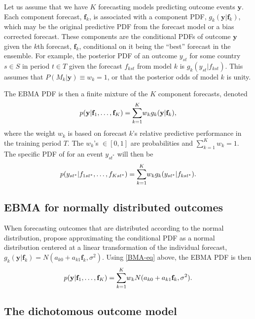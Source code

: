 \documentclass[pdftex,12pt,fullpage,oneside]{amsart}
\begin{document}
Let us assume that we have $K$ forecasting models predicting outcome
events $\mathbf{y}$. Each component forecast, $\mathbf{f}_k$, is associated with a
component PDF, $g_k(\mathbf{y}|\mathbf{f}_k)$, which may be the original predictive PDF
from the forecast model or a bias corrected forecast.  These
components are the conditional PDFs of outcome $\mathbf{y}$ given the
$k$th forecast, $\mathbf{f}_k$, conditional on it being the ``best'' forecast
in the ensemble. For example, the posterior PDF of an outcome $y_{st}$
for some country $s \in S$ in period $t \in T$ given the forecast
$f_{kst}$ from model $k$ is $g_k(y_{st}|f_{kst})$. This assumes that
$P(M_k | \mathbf{y}) \equiv w_k=1$, or that the posterior odds of model
$k$ is unity.

The EBMA PDF is then a finite mixture of the $K$ component forecasts,
denoted
\begin{equation}
\small
\label{BMA-eq}
p(\mathbf{y}|\mathbf{f}_1, \ldots, \mathbf{f}_K)=\overset{K}{\underset{k=1}{\sum}} w_k
g_k(\mathbf{y}|\mathbf{f}_k),
\end{equation}
\noindent where the weight $w_k$ is based on forecast $k$'s relative
predictive performance in the training period $T$. The $w_k$'s $\in
[0,1]$ are probabilities and $\sum_{k=1}^Kw_k=1$.  The specific PDF of
for an event $y_{st^*}$ will then be
\begin{equation}
\label{BMA-eq2}
\small
p(y_{st^*}|f_{1st^*}, \ldots,
f_{Kst^*})=\overset{K}{\underset{k=1}{\sum}} w_k
g_k(y_{st^*}|f_{kst^*}).
\end{equation}

\subsection{EBMA for normally distributed outcomes}

When forecasting outcomes that are distributed according to the normal
distribution, \citet{Raftery:2005} propose approximating the
conditional PDF as a normal distribution centered at a linear
transformation of the individual forecast, $g_k(\mathbf{y}|\mathbf{f}_k) = N(a_{k0} + a_{k1}\mathbf{f}_k,
\sigma^2)$.  Using \eqref{BMA-eq} above, the EBMA PDF is then
\begin{equation} \small
p(\mathbf{y}|\mathbf{f}_1, \ldots, \mathbf{f}_K) = \overset{K}{\underset{k=1}{\sum}} w_k N(a_{k0} +
a_{k1}\mathbf{f}_k, \sigma^2).
\end{equation}

\subsection{The dichotomous outcome model}
\end{document}
